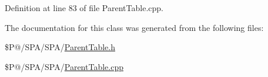 Definition at line 83 of file Parent\-Table.\-cpp.



The documentation for this class was generated from the following files\-:\begin{DoxyCompactItemize}
\item 
\$\-P@/\-S\-P\-A/\-S\-P\-A/\hyperlink{_parent_table_8h}{Parent\-Table.\-h}\item 
\$\-P@/\-S\-P\-A/\-S\-P\-A/\hyperlink{_parent_table_8cpp}{Parent\-Table.\-cpp}\end{DoxyCompactItemize}
